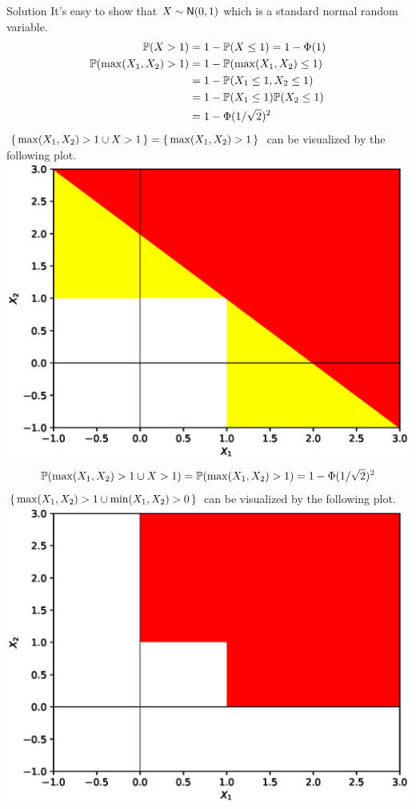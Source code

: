 \documentclass{article}
\begin{document}
\begin{solution}
    {Solution}
    It's easy to show that $X\sim\operatorname{\mathsf{N}}(0, 1)$ which is a standard normal random variable.
    \begin{align*}
        \P{X>1}
        &= 1- \P{X\leq 1} = 1-\Phi(1) \\
        \P{\max(X_1,X_2)>1}
        &= 1-\P{\max(X_1,X_2)\leq 1} \\
        &= 1-\P{X_1\leq 1, X_2\leq 1} \\
        &= 1-\P{X_1\leq 1}\P{X_2\leq 1} \\
        &= 1-\Phi(1/\sqrt{2})^2
    \end{align*}
    $\left\lbrace\,\max(X_1,X_2)>1 \cup X>1\,\right\rbrace=\left\lbrace\,\max(X_1,X_2)>1\,\right\rbrace$ can be visualized by the following plot.
    \includegraphics[width=\textwidth]{plot1.eps}
    \begin{align*}
        \P{\max(X_1,X_2)>1 \cup X>1}=\P{\max(X_1,X_2)>1} = 1-\Phi(1/\sqrt{2})^2
    \end{align*}
    $\left\lbrace\,\max(X_1,X_2)>1 \cup \min(X_1,X_2)>0\,\right\rbrace$ can be visualized by the following plot.
    \includegraphics[width=\textwidth]{plot2.eps}

\end{solution}
\end{document}
